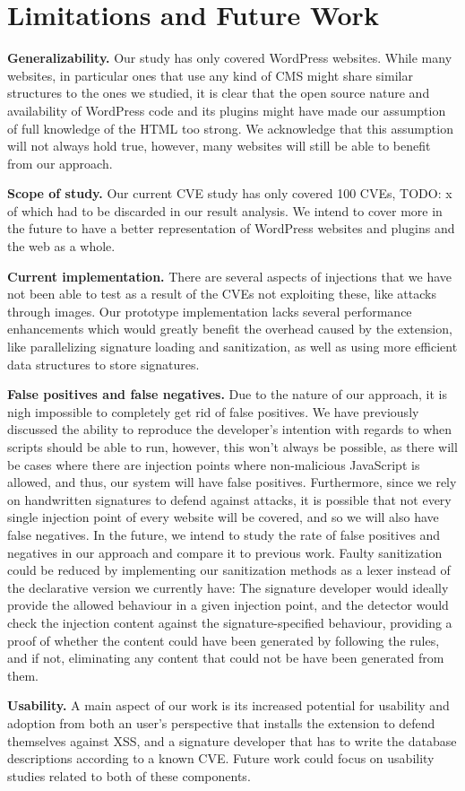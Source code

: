 \section{Limitations and Future Work}
\textbf{Generalizability.} Our study has only covered WordPress websites. While many websites, in particular ones that use any kind of CMS might share similar structures to the ones we studied, it is clear that the open source nature and availability of WordPress code and its plugins might have made our assumption of full knowledge of the HTML too strong. We acknowledge that this assumption will not always hold true, however, many websites will still be able to benefit from our approach.

\textbf{Scope of study.} Our current CVE study has only covered 100 CVEs, TODO: x of which had to be discarded in our result analysis. We intend to cover more in the future to have a better representation of WordPress websites and plugins and the web as a whole. 

\textbf{Current implementation.} There are several aspects of injections that we have not been able to test as a result of the CVEs not exploiting these, like attacks through images. Our prototype implementation lacks several performance enhancements which would greatly benefit the overhead caused by the extension, like parallelizing signature loading and sanitization, as well as using more efficient data structures to store signatures. 

\textbf{False positives and false negatives.} Due to the nature of our approach, it is nigh impossible to completely get rid of false positives. We have previously discussed the ability to reproduce the developer's intention with regards to when scripts should be able to run, however, this won't always be possible, as there will be cases where there are injection points where non-malicious JavaScript is allowed, and thus, our system will have false positives. Furthermore, since we rely on handwritten signatures to defend against attacks, it is possible that not every single injection point of every website will be covered, and so we will also have false negatives. In the future, we intend to study the rate of false positives and negatives in our approach and compare it to previous work. Faulty sanitization could be reduced by implementing our sanitization methods as a lexer instead of the declarative version we currently have: The signature developer would ideally provide the allowed behaviour in a given injection point, and the detector would check the injection content against the signature-specified behaviour, providing a proof of whether the content could have been generated by following the rules, and if not, eliminating any content that could not be have been generated from them.

\textbf{Usability.} A main aspect of our work is its increased potential for usability and adoption from both an user's perspective that installs the extension to defend themselves against XSS, and a signature developer that has to write the database descriptions according to a known CVE. Future work could focus on usability studies related to both of these components.
